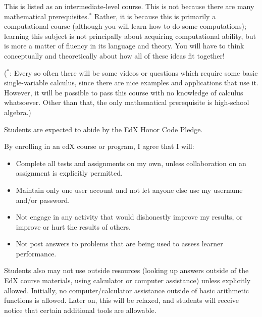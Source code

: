 \endedxtext


\endedxvertical







This is listed as an intermediate-level course.  This is not because there are many mathematical prerequisites.$^*$  Rather, it is because this is primarily {} a computational course (although you will learn
how to do some computations); 
learning this subject is not principally about acquiring computational ability, but is more a matter of fluency in its language and theory.  You will have to think conceptually and theoretically about how all of these ideas fit together!  


($^*$: Every so often there will be some videos or questions which require some basic single-variable calculus, since there are  
nice examples and applications that use it.  However, it will be possible to pass this course with no knowledge of calculus whatsoever.  
Other than that, the only mathematical prerequisite is high-school algebra.)




Students are expected to abide by the EdX Honor Code Pledge.

By enrolling in an edX course or program, I agree that I will:

\begin{itemize}
\item
Complete all tests and assignments on my own, unless collaboration on an assignment is explicitly permitted.
\item
Maintain only one user account and not let anyone else use my username and/or password.
\item
Not engage in any activity that would dishonestly improve my results, or improve or hurt the results of others.
\item
Not post answers to problems that are being used to assess learner performance.
\end{itemize}

Students also may not use outside resources (looking up answers outside of the EdX course materials, using calculator or 
computer assistance) unless explicitly allowed.  Initially, no computer/calculator assistance outside of basic arithmetic functions
is allowed.  Later on, this will be relaxed, and students will receive notice that certain additional tools are allowable.  


